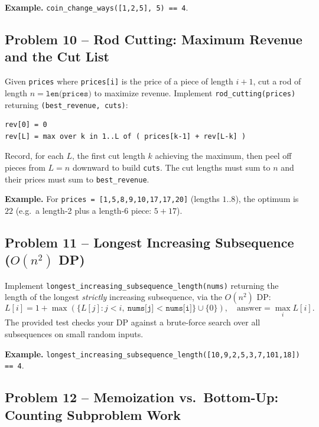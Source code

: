 \documentclass[11pt]{article}
\begin{document}
\textbf{Example.} \texttt{coin\_change\_ways([1,2,5], 5) == 4}.

\subsection*{Problem 10 -- Rod Cutting: Maximum Revenue and the Cut List}

Given \texttt{prices} where \texttt{prices[i]} is the price of a piece of length $i+1$, cut
a rod of length $n = \texttt{len(prices)}$ to maximize revenue. Implement
\texttt{rod\_cutting(prices)} returning \texttt{(best\_revenue, cuts)}:
\begin{verbatim}
rev[0] = 0
rev[L] = max over k in 1..L of ( prices[k-1] + rev[L-k] )
\end{verbatim}
Record, for each $L$, the first cut length $k$ achieving the maximum, then peel off pieces
from $L = n$ downward to build \texttt{cuts}. The cut lengths must sum to $n$ and their
prices must sum to \texttt{best\_revenue}.

\textbf{Example.} For \texttt{prices = [1,5,8,9,10,17,17,20]} (lengths $1..8$), the optimum
is $22$ (e.g.\ a length-2 plus a length-6 piece: $5 + 17$).

\subsection*{Problem 11 -- Longest Increasing Subsequence ($O(n^2)$ DP)}

Implement \texttt{longest\_increasing\_subsequence\_length(nums)} returning the length of
the longest \emph{strictly} increasing subsequence, via the $O(n^2)$ DP:
\[
L[i] = 1 + \max(\{L[j] : j < i,\ \texttt{nums[j] < nums[i]}\} \cup \{0\}),
\quad \text{answer} = \max_i L[i].
\]
The provided test checks your DP against a brute-force search over all subsequences on
small random inputs.

\textbf{Example.} \texttt{longest\_increasing\_subsequence\_length([10,9,2,5,3,7,101,18])
== 4}.

\subsection*{Problem 12 -- Memoization vs.\ Bottom-Up: Counting Subproblem Work}
\end{document}
